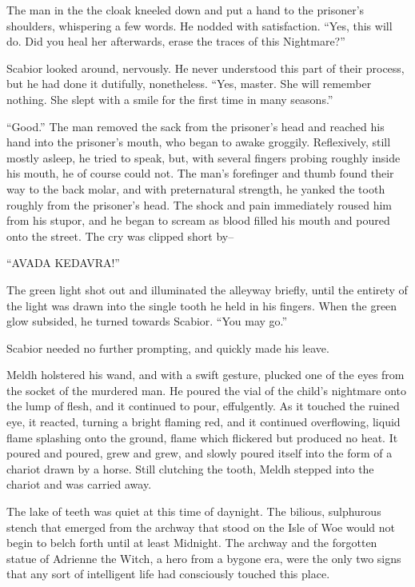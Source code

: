 The man in the the cloak kneeled down and put a hand to the prisoner’s shoulders, whispering a few words. He nodded with satisfaction. “Yes, this will do. Did you heal her afterwards, erase the traces of this Nightmare?”

Scabior looked around, nervously. He never understood this part of their process, but he had done it dutifully, nonetheless. “Yes, master. She will remember nothing. She slept with a smile for the first time in many seasons.”

“Good.” The man removed the sack from the prisoner’s head and reached his hand into the prisoner’s mouth, who began to awake groggily. Reflexively, still mostly asleep, he tried to speak, but, with several fingers probing roughly inside his mouth, he of course could not. The man’s forefinger and thumb found their way to the back molar, and with preternatural strength, he yanked the tooth roughly from the prisoner’s head. The shock and pain immediately roused him from his stupor, and he began to scream as blood filled his mouth and poured onto the street. The cry was clipped short by–

“AVADA KEDAVRA!”

The green light shot out and illuminated the alleyway briefly, until the entirety of the light was drawn into the single tooth he held in his fingers. When the green glow subsided, he turned towards Scabior. “You may go.”

Scabior needed no further prompting, and quickly made his leave.

Meldh holstered his wand, and with a swift gesture, plucked one of the eyes from the socket of the murdered man. He poured the vial of the child’s nightmare onto the lump of flesh, and it continued to pour, effulgently. As it touched the ruined eye, it reacted, turning a bright flaming red, and it continued overflowing, liquid flame splashing onto the ground, flame which flickered but produced no heat. It poured and poured, grew and grew, and slowly poured itself into the form of a chariot drawn by a horse. Still clutching the tooth, Meldh stepped into the chariot and was carried away.

\simpleline


The lake of teeth was quiet at this time of daynight. The bilious, sulphurous stench that emerged from the archway that stood on the Isle of Woe would not begin to belch forth until at least Midnight. The archway and the forgotten statue of Adrienne the Witch, a hero from a bygone era, were the only two signs that any sort of intelligent life had consciously touched this place.


